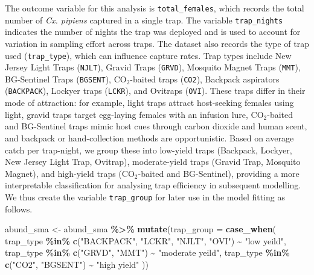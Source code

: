 \documentclass[
  letterpaper,
]{krantz}
\newenvironment{Shaded}{\begin{snugshade}}{\end{snugshade}}
\newcommand{\AttributeTok}[1]{\textcolor[rgb]{0.13,0.29,0.53}{#1}}
\newcommand{\FunctionTok}[1]{\textcolor[rgb]{0.13,0.29,0.53}{\textbf{#1}}}
\newcommand{\NormalTok}[1]{#1}
\newcommand{\OtherTok}[1]{\textcolor[rgb]{0.56,0.35,0.01}{#1}}
\newcommand{\SpecialCharTok}[1]{\textcolor[rgb]{0.81,0.36,0.00}{\textbf{#1}}}
\newcommand{\StringTok}[1]{\textcolor[rgb]{0.31,0.60,0.02}{#1}}
\begin{document}
The outcome variable for this analysis is \texttt{total\_females}, which
records the total number of \emph{Cx. pipiens} captured in a single
trap. The variable \texttt{trap\_nights} indicates the number of nights
the trap was deployed and is used to account for variation in sampling
effort across traps. The dataset also records the type of trap used
(\texttt{trap\_type}), which can influence capture rates. Trap types
include New Jersey Light Traps (\texttt{NJLT}), Gravid Traps
(\texttt{GRVD}), Mosquito Magnet Traps (\texttt{MMT}), BG-Sentinel Traps
(\texttt{BGSENT}), \(\text{CO}_2\)-baited traps (\texttt{CO2}), Backpack
aspirators (\texttt{BACKPACK}), Lockyer traps (\texttt{LCKR}), and
Ovitraps (\texttt{OVI}). These traps differ in their mode of attraction:
for example, light traps attract host-seeking females using light,
gravid traps target egg-laying females with an infusion lure,
\(\text{CO}_2\)-baited and BG-Sentinel traps mimic host cues through
carbon dioxide and human scent, and backpack or hand-collection methods
are opportunistic. Based on average catch per trap-night, we group these
into low-yield traps (Backpack, Lockyer, New Jersey Light Trap,
Ovitrap), moderate-yield traps (Gravid Trap, Mosquito Magnet), and
high-yield traps (\(\text{CO}_2\)-baited and BG-Sentinel), providing a
more interpretable classification for analysing trap efficiency in
subsequent modelling. We thus create the variable \texttt{trap\_group}
for later use in the model fitting as follows.

\begin{Shaded}
\begin{Highlighting}[]
\NormalTok{abund\_sma }\OtherTok{\textless{}{-}}\NormalTok{ abund\_sma }\SpecialCharTok{\%\textgreater{}\%}
  \FunctionTok{mutate}\NormalTok{(}\AttributeTok{trap\_group =} \FunctionTok{case\_when}\NormalTok{(}
\NormalTok{    trap\_type }\SpecialCharTok{\%in\%} \FunctionTok{c}\NormalTok{(}\StringTok{"BACKPACK"}\NormalTok{, }\StringTok{"LCKR"}\NormalTok{, }\StringTok{"NJLT"}\NormalTok{, }\StringTok{"OVI"}\NormalTok{) }\SpecialCharTok{\textasciitilde{}} \StringTok{"low yeild"}\NormalTok{,}
\NormalTok{    trap\_type }\SpecialCharTok{\%in\%} \FunctionTok{c}\NormalTok{(}\StringTok{"GRVD"}\NormalTok{, }\StringTok{"MMT"}\NormalTok{) }\SpecialCharTok{\textasciitilde{}} \StringTok{"moderate yeild"}\NormalTok{,}
\NormalTok{    trap\_type }\SpecialCharTok{\%in\%} \FunctionTok{c}\NormalTok{(}\StringTok{"CO2"}\NormalTok{, }\StringTok{"BGSENT"}\NormalTok{) }\SpecialCharTok{\textasciitilde{}} \StringTok{"high yield"}
\NormalTok{  ))}
\end{Highlighting}
\end{Shaded}
\end{document}
